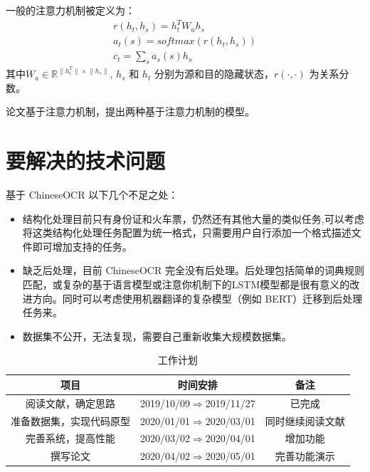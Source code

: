 一般的注意力机制被定义为：
\begin{equation}
\begin{gathered}
r(h_t, h_s) = h_t^T W_a h_s \\
a_t(s) = softmax(r(h_t, h_s)) \\
c_t = \sum_s a_s(s) h_s
\end{gathered}
\end{equation}
其中$W_a \in \mathbb{R}^{\lVert h_t^T \rVert \times \lVert h_s \rVert}$, $h_s$ 和 $h_t$ 分别为源和目的隐藏状态，$r(\cdot, \cdot)$ 为关系分数。

论文基于注意力机制，提出两种基于注意力机制的模型。

\chapter{要解决的技术问题}
基于 ChineseOCR 以下几个不足之处：
\begin{itemize}
	\item 结构化处理目前只有身份证和火车票，仍然还有其他大量的类似任务,可以考虑将这类结构化处理任务配置为统一格式，只需要用户自行添加一个格式描述文件即可增加支持的任务。
	\item 缺乏后处理，目前 ChineseOCR 完全没有后处理。后处理包括简单的词典规则匹配，或复杂的基于语言模型或注意你机制下的LSTM模型都是很有意义的改进方向。同时可以考虑使用机器翻译的复杂模型（例如 BERT）迁移到后处理任务来。
	\item 数据集不公开，无法复现，需要自己重新收集大规模数据集。
\end{itemize}


\begin{table}[!hpt]
	\caption[]{工作计划\label{tab:work_plan}}
	\centering
	\begin{tabular}{|c|c|c|}
		\hline
		项目 & 时间安排 & 备注 \\ [0.5ex] 
		\hline
		阅读文献，确定思路 & 2019/10/09$\Rightarrow$2019/11/27 & 已完成  \\ 
		\hline
		准备数据集，实现代码原型 & 2020/01/01$\Rightarrow$2020/03/01 & 同时继续阅读文献  \\ 
		\hline
		完善系统，提高性能 & 2020/03/02$\Rightarrow$2020/04/01 & 增加功能  \\
		\hline
		撰写论文 & 2020/04/02$\Rightarrow$2020/05/01 & 完善功能演示 \\[1ex] 
		\hline
	\end{tabular}
\end{table}

